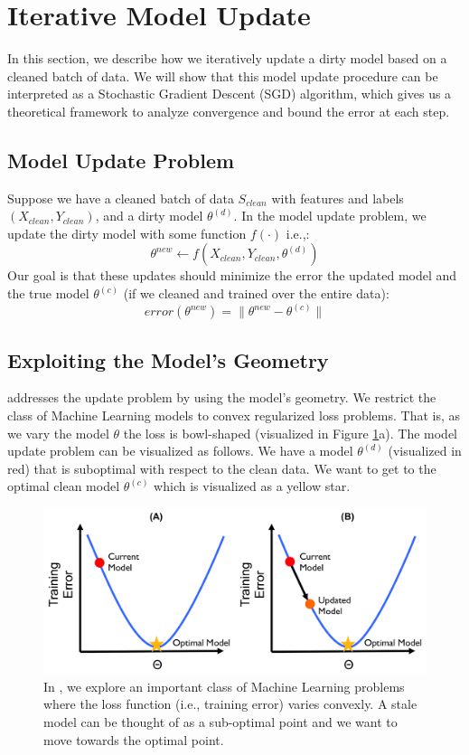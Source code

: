 \section{Iterative Model Update}\label{model-update}
In this section, we describe how we iteratively update a dirty model based on
a cleaned batch of data.
We will show that this model update procedure can be interpreted as a Stochastic 
Gradient Descent (SGD) algorithm, which gives us a theoretical framework to analyze
convergence and bound the error at each step.

\subsection{Model Update Problem}
Suppose we have a cleaned batch of data $S_{clean}$ with features and labels $(X_{clean},Y_{clean})$, and a dirty model $\theta^{(d)}$. 
In the model update problem, we update the dirty model with some function $f(\cdot)$ i.e.,:
\[
\theta^{new} \leftarrow f(X_{clean},Y_{clean},\theta^{(d)})
\]
Our goal is that these updates should minimize the error the updated model and the true model $\theta^{(c)}$ (if we cleaned and trained over the entire data):
\[
error(\theta^{new}) = \| \theta^{new} - \theta^{(c)} \|
\]

\subsection{Exploiting the Model's Geometry}
\sys addresses the update problem by using the model's geometry.
We restrict the class of Machine Learning models to convex regularized loss problems.
That is, as we vary the model $\theta$ the loss is bowl-shaped (visualized in Figure \ref{update-arch2}a).
The model update problem can be visualized as follows.
We have a model $\theta^{(d)}$ (visualized in red) that is suboptimal with respect to the clean data.
We want to get to the optimal clean model $\theta^{(c)}$ which is visualized as a yellow star.

\begin{figure}[ht!]
\centering
 \includegraphics[width=\columnwidth]{figs/update-arch2.png}
 \caption{In \sys, we explore an important class of Machine Learning problems where the loss function (i.e., training error) varies convexly. A stale model can be thought of as a sub-optimal point and we want to move towards the optimal point. \label{update-arch2}}
\end{figure}

